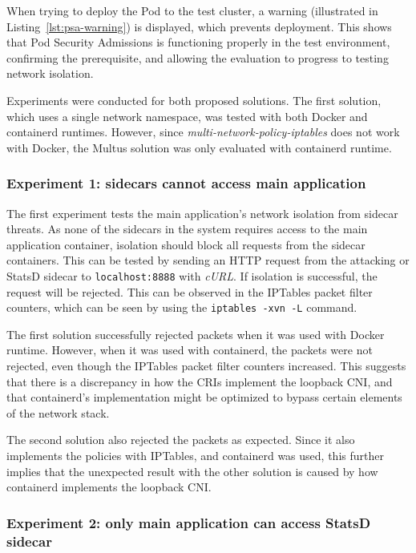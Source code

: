 \documentclass[english, 12pt, a4paper, sci, utf8, a-2b, online]{aaltothesis}
\begin{document}
When trying to deploy the Pod to the test cluster, a warning (illustrated in Listing~\ref{lst:psa-warning}) is displayed, which prevents deployment.
This shows that Pod Security Admissions is functioning properly in the test environment, confirming the prerequisite, and allowing the evaluation to progress to testing network isolation.



Experiments were conducted for both proposed solutions.
The first solution, which uses a single network namespace, was tested with both Docker and containerd runtimes.
However, since \emph{multi-network-policy-iptables} does not work with Docker, the Multus solution was only evaluated with containerd runtime.

\subsubsection{Experiment 1: sidecars cannot access main application}

The first experiment tests the main application's network isolation from sidecar threats.
As none of the sidecars in the system requires access to the main application container, isolation should block all requests from the sidecar containers.
This can be tested by sending an HTTP request from the attacking or StatsD sidecar to \lstinline{localhost:8888} with \emph{cURL}.
If isolation is successful, the request will be rejected.
This can be observed in the IPTables packet filter counters, which can be seen by using the \lstinline{iptables -xvn -L} command.

The first solution successfully rejected packets when it was used with Docker runtime.
However, when it was used with containerd, the packets were not rejected, even though the IPTables packet filter counters increased.
This suggests that there is a discrepancy in how the CRIs implement the loopback CNI, and that containerd's implementation might be optimized to bypass certain elements of the network stack.

The second solution also rejected the packets as expected.
Since it also implements the policies with IPTables, and containerd was used, this further implies that the unexpected result with the other solution is caused by how containerd implements the loopback CNI.

\subsubsection{Experiment 2: only main application can access StatsD sidecar}
\end{document}
